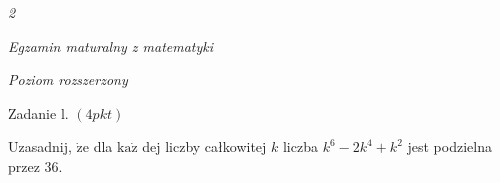 \documentclass[a4paper,12pt]{article}
\begin{document}
{\it 2}

{\it Egzamin maturalny z matematyki}

{\it Poziom rozszerzony}

Zadanie l. $(4pkt)$

Uzasadnij, $\dot{\mathrm{z}}\mathrm{e}$ dla $\mathrm{k}\mathrm{a}\dot{\mathrm{z}}$ dej liczby całkowitej $k$ liczba $k^{6}-2k^{4}+k^{2}$ jest podzielna przez 36.
\end{document}
